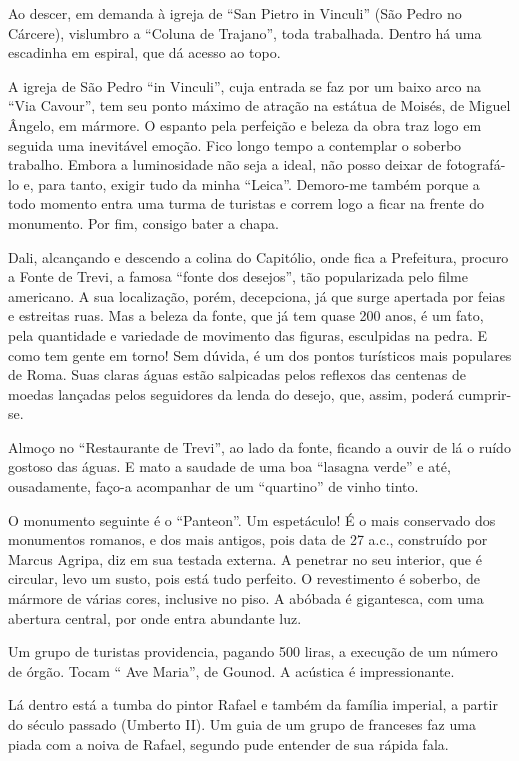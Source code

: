 Ao descer, em demanda à igreja de “San Pietro in Vinculi” (São Pedro no Cárcere), vislumbro a “Coluna de Trajano”, toda trabalhada. Dentro há uma escadinha em espiral, que dá acesso ao topo.

A igreja de São Pedro “in Vinculi”, cuja entrada se faz por um baixo arco na “Via Cavour”, tem seu ponto máximo de atração na estátua de Moisés, de Miguel Ângelo, em mármore. O espanto pela perfeição e beleza da obra traz logo em seguida uma inevitável emoção. Fico longo tempo a contemplar o soberbo trabalho. Embora a luminosidade não seja a ideal, não posso deixar de fotografá-lo e, para tanto, exigir tudo da minha “Leica”. Demoro-me também porque a todo momento entra uma turma de turistas e correm logo a ficar na frente do monumento. Por fim, consigo bater a chapa.

Dali, alcançando e descendo a colina do Capitólio, onde fica a Prefeitura, procuro a Fonte de Trevi, a famosa “fonte dos desejos”, tão popularizada pelo filme americano. A sua localização, porém, decepciona, já que surge apertada por feias e estreitas ruas. Mas a beleza da fonte, que já tem quase 200 anos, é um fato, pela quantidade e variedade de movimento das figuras, esculpidas na pedra. E como tem gente em torno! Sem dúvida, é um dos pontos turísticos mais populares de Roma. Suas claras águas estão salpicadas pelos reflexos das centenas de moedas lançadas pelos seguidores da lenda do desejo, que, assim, poderá cumprir-se.

Almoço no “Restaurante de Trevi”, ao lado da fonte, ficando a ouvir de lá o ruído gostoso das águas. E mato a saudade de uma boa “lasagna verde” e até, ousadamente, faço-a acompanhar de um “quartino” de vinho tinto.

O monumento seguinte é o “Panteon”. Um espetáculo! É o mais conservado dos monumentos romanos, e dos mais antigos, pois data de 27 a.c., construído por Marcus Agripa, diz em sua testada externa. A penetrar no seu interior, que é circular, levo um susto, pois está tudo perfeito. O revestimento é soberbo, de mármore de várias cores, inclusive no piso. A abóbada é gigantesca, com uma abertura central, por onde entra abundante luz.

Um grupo de turistas providencia, pagando 500 liras, a execução de um número de órgão. Tocam “ Ave Maria”, de Gounod. A acústica é impressionante.

Lá dentro está a tumba do pintor Rafael e também da família imperial, a partir do século passado (Umberto II). Um guia de um grupo de franceses faz uma piada com a noiva de Rafael, segundo pude entender de sua rápida fala.

